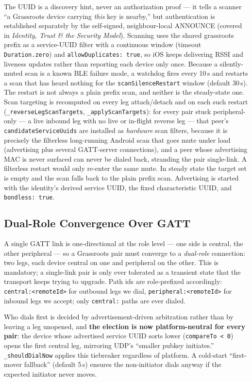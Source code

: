 \documentclass[11pt]{report}
\newcommand{\code}[1]{\texttt{\small #1}}
\begin{document}
The UUID is a discovery hint, never an authorization proof --- it tells a scanner ``a Grassroots device carrying \emph{this} key is nearby,'' but authentication is established separately by the self-signed, neighbour-local ANNOUNCE (covered in \emph{Identity, Trust \& the Security Model}). Scanning uses the shared grassroots prefix as a service-UUID filter with a continuous window (timeout \code{Duration.zero}) and \code{allowDuplicates: true}, so iOS keeps delivering RSSI and liveness updates rather than reporting each device only once. Because a silently-muted scan is a known BLE failure mode, a watchdog fires every 10\,s and restarts a scan that has heard nothing for the \code{scanSilenceRestart} window (default 30\,s). The restart is not always a plain prefix scan, and neither is the steady-state one. Scan targeting is recomputed on every leg attach/detach and on each such restart (\code{\_reverseLegScanTargets}, \code{\_applyScanTargets}): for every pair stuck peripheral-only --- a live inbound leg with no live or in-flight reverse leg --- that peer's \code{candidateServiceUuids} are installed as \emph{hardware} scan filters, because it is precisely the filterless long-running Android scan that goes mute under load (advertising plus several GATT-server connections), and a peer whose advertising MAC is never surfaced can never be dialed back, stranding the pair single-link. A filterless restart would only re-enter the same mute. In steady state the target set is empty and the scan falls back to the plain prefix scan. Advertising is started with the identity's derived service UUID, the fixed characteristic UUID, and \code{bondless: true}.

\subsection{Dual-Role Convergence Over GATT}

A single GATT link is one-directional at the role level --- one side is central, the other peripheral --- so a Grassroots pair must converge to a \emph{dual-role} connection: two legs, each device central on one and peripheral on the other. This is mandatory; a single-link pair is only ever tolerated as a transient state that the transport keeps trying to upgrade. Path ids are role-prefixed accordingly: \code{central:<remoteId>} for outbound legs we dial, \code{peripheral:<remoteId>} for inbound legs we accept; only \code{central:} paths are ever dialed.

Who dials first is decided by advertisement-driven arbitration rather than by leaving a leg unopened, and \textbf{the election is now platform-neutral for every pair}: the device whose advertised service UUID sorts lower (\code{compareTo < 0}) opens the first central leg, mirroring UDP's ``smaller pubkey initiates.'' \code{\_shouldDialNow} applies this tiebreaker regardless of platform. A cold-start ``first-mover fallback'' (default 5\,s) ensures the non-initiator dials anyway if the expected initiator never moves.
\end{document}
